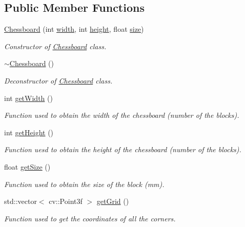 \subsection*{Public Member Functions}
\begin{DoxyCompactItemize}
\item 
\hyperlink{class_chessboard_aa80499df26acccc4fd9d6449c1d847f0}{Chessboard} (int \hyperlink{class_chessboard_a508e83c453e3aef8af69bdb934262d83}{width}, int \hyperlink{class_chessboard_ad7baa62b4f5f47627bae49a53475a56c}{height}, float \hyperlink{class_chessboard_a898569d2e3c1e297f9915fa437c41082}{size})
\begin{DoxyCompactList}\small\item\em Constructor of \hyperlink{class_chessboard}{Chessboard} class. \end{DoxyCompactList}\item 
\hyperlink{class_chessboard_a53eac522998d8d92cca409493c773f54}{$\sim$\+Chessboard} ()
\begin{DoxyCompactList}\small\item\em Deconstructor of \hyperlink{class_chessboard}{Chessboard} class. \end{DoxyCompactList}\item 
int \hyperlink{class_chessboard_aeecfc5f0c890fec1db2a45619332459b}{get\+Width} ()
\begin{DoxyCompactList}\small\item\em Function used to obtain the width of the chessboard (number of the blocks). \end{DoxyCompactList}\item 
int \hyperlink{class_chessboard_a5cbb8122bc0f8fc08d82e0541e01f7da}{get\+Height} ()
\begin{DoxyCompactList}\small\item\em Function uesd to obtain the height of the chessboard (number of the blocks). \end{DoxyCompactList}\item 
float \hyperlink{class_chessboard_a4640a7683d77d32621fa8821f1ec3d7d}{get\+Size} ()
\begin{DoxyCompactList}\small\item\em Function used to obtain the size of the block (mm). \end{DoxyCompactList}\item 
std\+::vector$<$ cv\+::\+Point3f $>$ \hyperlink{class_chessboard_af81a2c5b8a5914ef625a7accd0f2462f}{get\+Grid} ()
\begin{DoxyCompactList}\small\item\em Function used to get the coordinates of all the corners. \end{DoxyCompactList}\end{DoxyCompactItemize}
